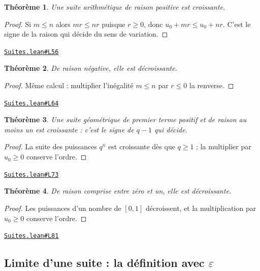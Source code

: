\documentclass[11pt,a4paper]{article}
\theoremstyle{definition}
\theoremstyle{plain}
\newtheorem{theoreme}{Théorème}
\newcommand{\source}[2]{\par\smallskip\noindent\hfill{\footnotesize\href{#1}{\texttt{#2}}}\par\smallskip}
\begin{document}
\begin{theoreme}
Une suite arithmétique de raison positive est croissante.
\end{theoreme}

\begin{proof}
Si $m \le n$ alors $mr \le nr$ puisque $r \ge 0$, donc $u_0 + mr \le u_0 + nr$. C'est le
signe de la raison qui décide du sens de variation.
\end{proof}
\source{https://github.com/Commutator-IO/learn-lean/blob/main/courses/02-lycee/03-suites/Suites.lean\#L56}{Suites.lean\#L56}

\begin{theoreme}
De raison négative, elle est décroissante.
\end{theoreme}

\begin{proof}
Même calcul : multiplier l'inégalité $m \le n$ par $r \le 0$ la renverse.
\end{proof}
\source{https://github.com/Commutator-IO/learn-lean/blob/main/courses/02-lycee/03-suites/Suites.lean\#L64}{Suites.lean\#L64}

\begin{theoreme}
Une suite géométrique de premier terme positif et de raison au moins un est croissante :
c'est le signe de $q - 1$ qui décide.
\end{theoreme}

\begin{proof}
La suite des puissances $q^n$ est croissante dès que $q \ge 1$ ; la multiplier par
$u_0 \ge 0$ conserve l'ordre.
\end{proof}
\source{https://github.com/Commutator-IO/learn-lean/blob/main/courses/02-lycee/03-suites/Suites.lean\#L73}{Suites.lean\#L73}

\begin{theoreme}
De raison comprise entre zéro et un, elle est décroissante.
\end{theoreme}

\begin{proof}
Les puissances d'un nombre de $[0, 1]$ décroissent, et la multiplication par
$u_0 \ge 0$ conserve l'ordre.
\end{proof}
\source{https://github.com/Commutator-IO/learn-lean/blob/main/courses/02-lycee/03-suites/Suites.lean\#L81}{Suites.lean\#L81}

\subsection{Limite d'une suite : la définition avec \texttt{\(\varepsilon\)}}
\end{document}
